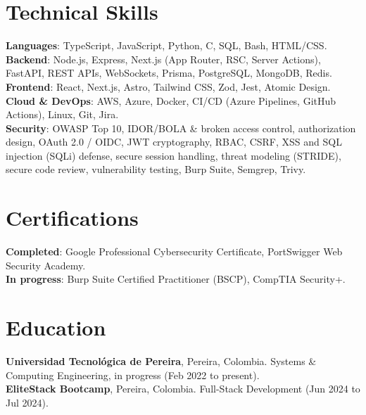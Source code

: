 \section{Technical Skills}
\vspace{-2pt}
 \begin{itemize}[leftmargin=0.15in, label={}]
    \small{\item{
     \textbf{Languages}{: TypeScript, JavaScript, Python, C, SQL, Bash, HTML/CSS.} \\[0.4mm]
     \textbf{Backend}{: Node.js, Express, Next.js (App Router, RSC, Server Actions), FastAPI, REST APIs, WebSockets, Prisma, PostgreSQL, MongoDB, Redis.} \\[0.4mm]
     \textbf{Frontend}{: React, Next.js, Astro, Tailwind CSS, Zod, Jest, Atomic Design.} \\[0.4mm]
     \textbf{Cloud \& DevOps}{: AWS, Azure, Docker, CI/CD (Azure Pipelines, GitHub Actions), Linux, Git, Jira.} \\[0.4mm]
     \textbf{Security}{: OWASP Top 10, IDOR/BOLA \& broken access control, authorization design, OAuth 2.0 / OIDC, JWT cryptography, RBAC, CSRF, XSS and SQL injection (SQLi) defense, secure session handling, threat modeling (STRIDE), secure code review, vulnerability testing, Burp Suite, Semgrep, Trivy.} \\[0.4mm]
    }}
 \end{itemize}
 \vspace{-11pt}
\section{Certifications}
\vspace{-2pt}
 \begin{itemize}[leftmargin=0.15in, label={}]
    \small{\item{
     \textbf{Completed}{: Google Professional Cybersecurity Certificate, PortSwigger Web Security Academy.} \\[0.4mm]
     \textbf{In progress}{: Burp Suite Certified Practitioner (BSCP), CompTIA Security+.} \\[0.4mm]
    }}
 \end{itemize}
 \vspace{-11pt}
\section{Education}
\vspace{-2pt}
 \begin{itemize}[leftmargin=0.15in, label={}]
    \small{\item{
     \textbf{Universidad Tecnológica de Pereira}{, Pereira, Colombia. Systems \& Computing Engineering, in progress (Feb 2022 to present).} \\[0.4mm]
     \textbf{EliteStack Bootcamp}{, Pereira, Colombia. Full-Stack Development (Jun 2024 to Jul 2024).} \\[0.4mm]
    }}
 \end{itemize}


